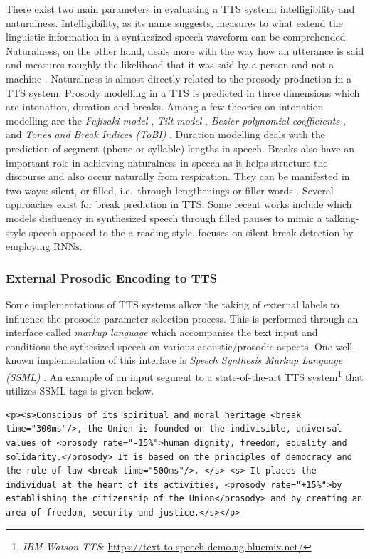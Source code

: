 There exist two main parameters in evaluating a TTS system: intelligibility and naturalness. Intelligibility, as its name suggests, measures to what extend the linguistic information in a synthesized speech waveform can be comprehended. Naturalness, on the other hand, deals more with the way how an utterance is said and measures roughly the likelihood that it was said by a person and not a machine \citep{naturalness}. Naturalness is almost directly related to the prosody production in a TTS system. Prosody modelling in a TTS is predicted in three dimensions which are intonation, duration and breaks. Among a few theories on intonation modelling are the \textit{Fujisaki model} \citep{Fujisaki1983}, \textit{Tilt model} \citep{tilt}, \textit{Bezier polynomial coefficients} \citep{Escudero2002}, and \textit{Tones and Break Indices (ToBI)} \citep{tobi, Pierrehumbert}. Duration modelling deals with the prediction of segment (phone or syllable) lengths in speech. Breaks also have an important role in achieving naturalness in speech as it helps structure the discourse and also occur naturally from respiration. They can be manifested in two ways: silent, or filled, i.e.~through lengthenings or filler words \citep{zellner}. Several approaches exist for break prediction in TTS. Some recent works include \cite{DBLP:journals/pdln/AgueroB03} which models disfluency in synthesized speech through filled pauses to mimic a talking-style speech opposed to the a reading-style. \cite{DBLP:conf/iberspeech/PascualB16} focuses on silent break detection by employing RNNs. 

\subsubsection*{External Prosodic Encoding to TTS}

Some implementations of TTS systems allow the taking of external labels to influence the prosodic parameter selection process. This is performed through an interface called \textit{markup language} which accompanies the text input and conditions the sythesized speech on various acoustic/prosodic aspects. One well-known implementation of this interface is \textit{Speech Synthesis Markup Language (SSML)} \citep{ssml}. An example of an input segment to a state-of-the-art TTS system\footnote{\textit{IBM Watson TTS}: \url{https://text-to-speech-demo.ng.bluemix.net/}} that utilizes SSML tags is given below.

\begin{lstlisting}
<p><s>Conscious of its spiritual and moral heritage <break time="300ms"/>, the Union is founded on the indivisible, universal values of <prosody rate="-15%">human dignity, freedom, equality and solidarity.</prosody> It is based on the principles of democracy and the rule of law <break time="500ms"/>. </s> <s> It places the individual at the heart of its activities, <prosody rate="+15%">by establishing the citizenship of the Union</prosody> and by creating an area of freedom, security and justice.</s></p>
\end{lstlisting}


